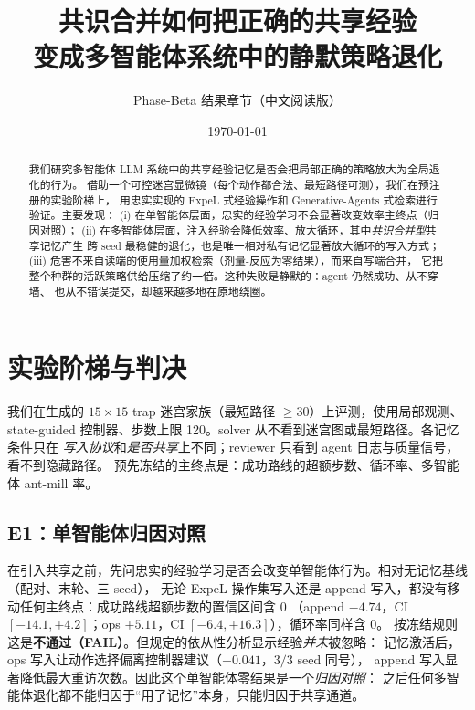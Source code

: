 \documentclass[UTF8,11pt]{ctexart}
\title{共识合并如何把正确的共享经验\\ 变成多智能体系统中的静默策略退化}
\author{Phase-Beta 结果章节（中文阅读版）}
\date{\today}
\begin{document}
\maketitle

\begin{center}
\end{center}

\begin{abstract}
我们研究多智能体 LLM 系统中的共享经验记忆是否会把局部正确的策略放大为全局退化的行为。
借助一个可控迷宫显微镜（每个动作都合法、最短路径可测），我们在预注册的实验阶梯上，
用忠实实现的 ExpeL 式经验操作和 Generative-Agents 式检索进行验证。主要发现：
(i) 在单智能体层面，忠实的经验学习不会显著改变效率主终点（归因对照）；
(ii) 在多智能体层面，注入经验会降低效率、放大循环，其中\emph{共识合并型}共享记忆产生
跨 seed 最稳健的退化，也是唯一相对私有记忆显著放大循环的写入方式；
(iii) 危害不来自读端的使用量加权检索（剂量-反应为零结果），而来自写端合并，
它把整个种群的活跃策略供给压缩了约一倍。这种失败是静默的：agent 仍然成功、从不穿墙、
也从不错误提交，却越来越多地在原地绕圈。
\end{abstract}

\section{实验阶梯与判决}

我们在生成的 $15\times15$ trap 迷宫家族（最短路径 $\geq 30$）上评测，使用局部观测、
state-guided 控制器、步数上限 120。solver 从不看到迷宫图或最短路径。各记忆条件只在
\emph{写入协议}和\emph{是否共享}上不同；reviewer 只看到 agent 日志与质量信号，看不到隐藏路径。
预先冻结的主终点是：成功路线的超额步数、循环率、多智能体 ant-mill 率。

\subsection{E1：单智能体归因对照}

在引入共享之前，先问忠实的经验学习是否会改变单智能体行为。相对无记忆基线（配对、末轮、三 seed），
无论 ExpeL 操作集写入还是 append 写入，都没有移动任何主终点：成功路线超额步数的置信区间含 0
（append $-4.74$，CI $[-14.1, +4.2]$；ops $+5.11$，CI $[-6.4, +16.3]$），循环率同样含 0。
按冻结规则这是\textbf{不通过（FAIL）}。但规定的依从性分析显示经验\emph{并未}被忽略：
记忆激活后，ops 写入让动作选择偏离控制器建议（$+0.041$，$3/3$ seed 同号），
append 写入显著降低最大重访次数。因此这个单智能体零结果是一个\emph{归因对照}：
之后任何多智能体退化都不能归因于“用了记忆”本身，只能归因于共享通道。
\end{document}
